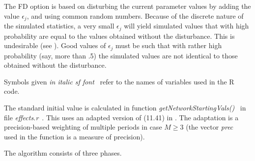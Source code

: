 \documentclass[a4paper,12pt,fleqn]{article}
\newcommand{\nnm}[1]{\textsf{\small\textit{#1}\ }}
\newcommand{\R}{{\sf R }}
\begin{document}
The FD option is based on disturbing the current parameter values
by adding the value $\epsilon_j$, and using common random numbers.
Because of the discrete nature of the simulated
statistics, a very small $\epsilon_j$ will yield simulated values that
with high probability are equal to the values obtained without
the disturbance. This is undesirable
(see \citet{SchweinbergerSnijders07a}).
Good values of $\epsilon_j$ must be such that with rather
high probability (say, more than .5) the simulated values are
not identical to those obtained without the disturbance.


Symbols given \nnm{in italic sf font} refer to the names
of variables used in the \R code.

The standard initial value is calculated in function
\nnm{getNetworkStartingVals()} in file \nnm{effects.r}.
This uses an adapted version of (11.41) in \citet{Snijders05}.
The adaptation is a precision-based weighting of multiple periods
in case $M \geq 3$ (the vector \nnm{prec} used in the function
is a measure of precision).


The algorithm consists of three phases.
\end{document}
